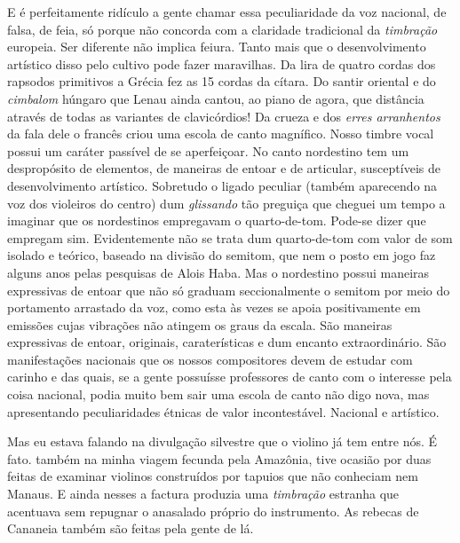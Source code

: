 E é perfeitamente ridículo a gente chamar essa peculiaridade da voz
nacional, de falsa, de feia, só porque não concorda com a claridade
tradicional da \textit{timbração} europeia. Ser diferente não implica feiura.
Tanto mais que o desenvolvimento artístico disso pelo cultivo pode fazer
maravilhas. Da lira de quatro cordas dos rapsodos primitivos a Grécia fez as
15 cordas da cítara. Do santir oriental e do \textit{cimbalom} húngaro que Lenau
ainda cantou, ao piano de agora, que distância através de todas as
variantes de clavicórdios! Da crueza e dos \textit{erres arranhentos} da fala
dele o francês criou uma escola de canto magnífico. Nosso timbre vocal
possui um caráter passível de se aperfeiçoar. No canto nordestino tem um
despropósito de elementos, de maneiras de entoar e de articular,
susceptíveis de desenvolvimento artístico. Sobretudo o ligado peculiar
(também aparecendo na voz dos violeiros do centro) dum \textit{glissando} tão
preguiça que cheguei um tempo a imaginar que os nordestinos empregavam o
quarto-de-tom. Pode-se dizer que empregam sim. Evidentemente não se
trata dum quarto-de-tom com valor de som isolado e teórico, baseado na
divisão do semitom, que nem o posto em jogo faz alguns anos pelas
pesquisas de Alois Haba. Mas o nordestino possui maneiras expressivas de
entoar que não só graduam seccionalmente o semitom por meio do
portamento arrastado da voz, como esta às vezes se apoia positivamente
em emissões cujas vibrações não atingem os graus da escala. São maneiras
expressivas de entoar, originais, caraterísticas e dum encanto
extraordinário. São manifestações nacionais que os nossos compositores
devem de estudar com carinho e das quais, se a gente possuísse
professores de canto com o interesse pela coisa nacional, podia muito
bem sair uma escola de canto não digo nova, mas apresentando
peculiaridades étnicas de valor incontestável. Nacional e artístico.

Mas eu estava falando na divulgação silvestre que o violino já tem entre
nós. É fato. também na minha viagem fecunda pela Amazônia, tive ocasião
por duas feitas de examinar violinos construídos por tapuios que não
conheciam nem Manaus. E ainda nesses a factura produzia uma \textit{timbração}
estranha que acentuava sem repugnar o anasalado próprio do instrumento.
As rebecas de Cananeia também são feitas pela gente de lá.

